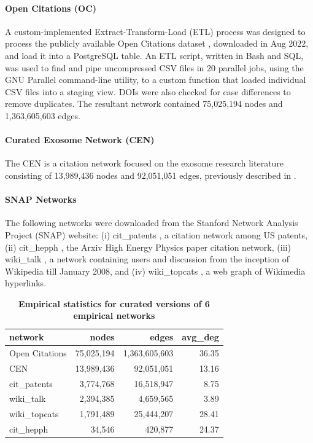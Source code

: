\documentclass[11pt]{article}   	%
\begin{document}
\paragraph{Open Citations (OC)}
A custom-implemented Extract-Transform-Load (ETL) process was designed to process the publicly available Open Citations dataset \citep{Peroni2020}, downloaded in Aug 2022,  and load it into a PostgreSQL table. An ETL script, written in Bash and SQL, was used to find and pipe uncompressed CSV files in 20 parallel jobs, using the GNU Parallel command-line utility, to a custom function that loaded individual CSV files into a staging view. DOIs were also checked for case differences to remove duplicates.  The resultant network contained 75,025,194 nodes and 1,363,605,603 edges.


\paragraph{Curated Exosome Network (CEN)}
The CEN is a citation network focused on the exosome research literature consisting of 13,989,436 nodes and 92,051,051 edges, previously described in \cite{Jakatdar_2022}.

\paragraph{SNAP Networks}The following networks were downloaded from the Stanford Network Analysis Project (SNAP) website:
 (i) cit\_patents \citep{Leskovec2005}, a citation network among US patents,
(ii) cit\_hepph \citep{Leskovec2005}, the Arxiv High Energy Physics paper citation network,
(iii) wiki\_talk \citep{Leskovec2010}, a network containing users and discussion from the inception of Wikipedia till January 2008,  and
(iv) wiki\_topcats \citep{Yin2017}, a web graph of Wikimedia hyperlinks.

\begin{table}[ht]
\centering
\begin{tabular}{lrrr}
  \hline
 network & nodes & edges & avg\_deg \\
  \hline
  Open Citations &   75,025,194 & 1,363,605,603  &  36.35 \\
  CEN &  13,989,436 &  92,051,051 & 13.16\\
  cit\_patents &   3,774,768 & 16,518,947 &   8.75 \\
  wiki\_talk &   2,394,385 & 4,659,565 & 3.89 \\
  wiki\_topcats &   1,791,489 &  25,444,207 & 28.41 \\
  cit\_hepph &   34,546 & 420,877 & 24.37 \\
   \hline
\end{tabular}
\caption{\textbf{Empirical statistics for curated versions of 6 empirical networks}}
\label{tab:empirical-stats-all}
\end{table}
\end{document}
